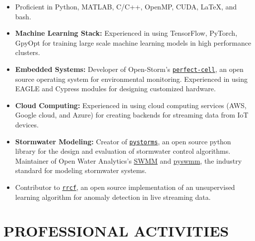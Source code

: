 \documentclass{my_cv}
\begin{document}
\begin{itemize}
	\item Proficient in Python, MATLAB, C/C++, OpenMP, CUDA, \LaTeX, and bash.
	\item \textbf{Machine Learning Stack:} Experienced in using TensorFlow, PyTorch, GpyOpt for training large scale machine learning models in high performance clusters. 
	\item \textbf{Embedded Systems:} Developer of Open-Storm's \href{https://github.com/open-storm/perfect-cell}{\texttt{perfect-cell}}, an open source operating system for environmental monitoring. Experienced in using EAGLE and Cypress modules for designing customized hardware.  
	\item \textbf{Cloud Computing:} Experienced in using cloud computing services (AWS, Google cloud, and Azure) for creating backends for streaming data from IoT devices. 
	\item \textbf{Stormwater Modeling:} Creator of \href{https://klabum.github.io/pystorms/}{\texttt{pystorms}}, an open source python library for the design and evaluation of stormwater control algorithms. Maintainer of Open Water Analytics's \href{https://github.com/OpenWaterAnalytics/Stormwater-Management-Model}{SWMM} and \href{https://github.com/OpenWaterAnalytics/pyswmm}{pyswmm}, the industry standard for modeling stormwater systems. 
	\item Contributor to \href{https://github.com/kLabUM/rrcf}{\texttt{rrcf}}, an open source implementation of an unsupervised learning algorithm for anomaly detection in live streaming data. 
\end{itemize}


\section*{PROFESSIONAL ACTIVITIES}
\end{document}
